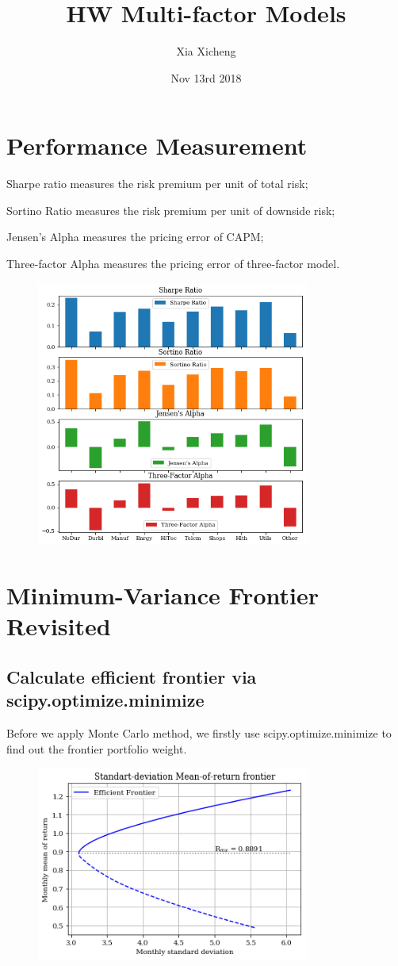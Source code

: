 \documentclass{article}
\title{HW Multi-factor Models}
\date{Nov 13rd 2018}
\author{Xia Xicheng}
\begin{document}
	\maketitle
\section{Performance Measurement}

\quad

Sharpe ratio measures the risk premium per unit of total risk;

Sortino Ratio measures the risk premium per unit of downside risk;

Jensen's Alpha measures the pricing error of CAPM;

Three-factor Alpha measures the pricing error of three-factor model.
\begin{figure}[h]
	\centering
	\includegraphics[width=9cm]{output_17_0.png}
\end{figure}

\section{Minimum-Variance Frontier Revisited}
\subsection{Calculate efficient frontier via scipy.optimize.minimize}
Before we apply Monte Carlo method, we firstly use scipy.optimize.minimize to find out the frontier portfolio weight.
\begin{figure}[h]
	\centering
	\includegraphics[width=9cm]{output_25_0.png}
\end{figure}
\end{document}
